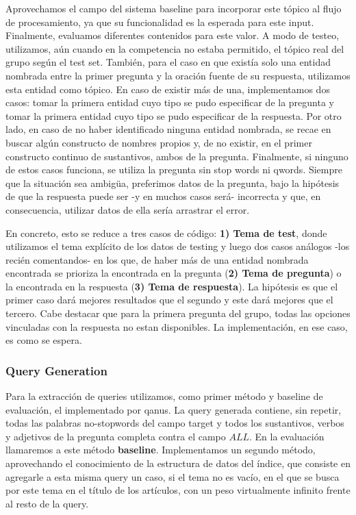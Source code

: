 Aprovechamos el campo  del sistema baseline para incorporar este tópico al flujo de procesamiento, ya que su funcionalidad es la esperada para este input.
Finalmente, evaluamos diferentes contenidos para este valor. A modo de testeo, utilizamos, aún cuando en la competencia no estaba permitido, el tópico real del grupo según el test set. También, para el caso en que existía solo una entidad nombrada entre la primer pregunta y la oración fuente de su respuesta, utilizamos esta entidad como tópico. En caso de existir más de una, implementamos dos casos: tomar la primera entidad cuyo tipo se pudo especificar de la pregunta y tomar la primera entidad cuyo tipo se pudo especificar de la respuesta. Por otro lado, en caso de no haber identificado ninguna entidad nombrada, se recae en buscar algún constructo de nombres propios y, de no existir, en el primer constructo continuo de sustantivos, ambos de la pregunta. Finalmente, si ninguno de estos casos funciona, se utiliza la pregunta sin stop words ni qwords. Siempre que la situación sea ambigüa, preferimos datos de la pregunta, bajo la hipótesis de que la respuesta puede ser -y en muchos casos será- incorrecta y que, en consecuencia, utilizar datos de ella sería arrastrar el error. 

En concreto, esto se reduce a tres casos de código: \textbf{1) Tema de test}, donde utilizamos el tema explícito de los datos de testing y luego dos casos análogos -los recién comentandos- en los que, de haber más de una entidad nombrada encontrada se prioriza la encontrada en la pregunta (\textbf{2) Tema de pregunta}) o la encontrada en la respuesta (\textbf{3) Tema de respuesta}). La hipótesis es que el primer caso dará mejores resultados que el segundo y este dará mejores que el tercero. Cabe destacar que para la primera pregunta del grupo, todas las opciones vinculadas con la respuesta no estan disponibles. La implementación, en ese caso, es como se espera. 

\subsubsection{Query Generation}

Para la extracción de queries utilizamos, como primer método y baseline de evaluación, el implementado por qanus. La query generada contiene, sin repetir, todas las palabras no-stopwords del campo target y todos los sustantivos, verbos y adjetivos de la pregunta completa contra el campo $ALL$. En la evaluación llamaremos a este método \textbf{baseline}. Implementamos un segundo método, aprovechando el conocimiento de la estructura de datos del índice, que consiste en agregarle a esta misma query un caso, si el tema no es vacío, en el que se busca por este tema en el título de los artículos, con un peso virtualmente infinito frente al resto de la query.


